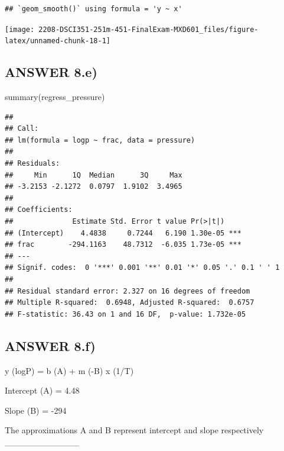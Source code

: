 \documentclass[
]{article}
\newenvironment{Shaded}{\begin{snugshade}}{\end{snugshade}}
\newcommand{\FunctionTok}[1]{\textcolor[rgb]{0.00,0.00,0.00}{#1}}
\newcommand{\NormalTok}[1]{#1}
\begin{document}
\begin{verbatim}
## `geom_smooth()` using formula = 'y ~ x'
\end{verbatim}

\begin{center}\texttt{[image: 2208-DSCI351-251m-451-FinalExam-MXD601\_files/figure-latex/unnamed-chunk-18-1]} \end{center}

\hypertarget{answer-8.e}{%
\subsection{ANSWER 8.e)}\label{answer-8.e}}

\begin{Shaded}
\begin{Highlighting}[]
\FunctionTok{summary}\NormalTok{(regress\_pressure)}
\end{Highlighting}
\end{Shaded}

\begin{verbatim}
## 
## Call:
## lm(formula = logp ~ frac, data = pressure)
## 
## Residuals:
##     Min      1Q  Median      3Q     Max 
## -3.2153 -2.1272  0.0797  1.9102  3.4965 
## 
## Coefficients:
##              Estimate Std. Error t value Pr(>|t|)    
## (Intercept)    4.4838     0.7244   6.190 1.30e-05 ***
## frac        -294.1163    48.7312  -6.035 1.73e-05 ***
## ---
## Signif. codes:  0 '***' 0.001 '**' 0.01 '*' 0.05 '.' 0.1 ' ' 1
## 
## Residual standard error: 2.327 on 16 degrees of freedom
## Multiple R-squared:  0.6948, Adjusted R-squared:  0.6757 
## F-statistic: 36.43 on 1 and 16 DF,  p-value: 1.732e-05
\end{verbatim}

\hypertarget{answer-8.f}{%
\subsection{ANSWER 8.f)}\label{answer-8.f}}

y (logP) = b (A) + m (-B) x (1/T)

Intercept (A) = 4.48

Slope (B) = -294

The approximations A and B represent intercept and slope respectively
\_\_\_\_\_\_\_\_\_\_\_\_
\end{document}

